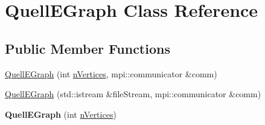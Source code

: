 \hypertarget{a00100}{}\section{Quell\+E\+Graph Class Reference}
\label{a00100}
\subsection*{Public Member Functions}
\begin{DoxyCompactItemize}
\item 
\hyperlink{a00100_a9d92d1de06bf78f5d3eb233480c472ca}{Quell\+E\+Graph} (int \hyperlink{a00100_aedbe28d892ab9e08522395cd1b63c612}{n\+Vertices}, mpi\+::communicator \&comm)
\item 
\hyperlink{a00100_a4fe13d4ae18899f2d50d986e206134a1}{Quell\+E\+Graph} (std\+::istream \&file\+Stream, mpi\+::communicator \&comm)
\item 
{\bfseries Quell\+E\+Graph} (int \hyperlink{a00100_aedbe28d892ab9e08522395cd1b63c612}{n\+Vertices})\hypertarget{a00100_a8e0181767b0fd906ea388708019358cd}{}\label{a00100_a8e0181767b0fd906ea388708019358cd}


\end{DoxyCompactItemize}
